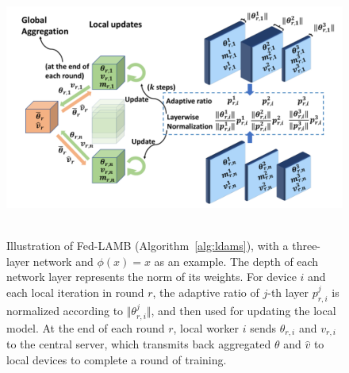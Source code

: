 \documentclass[11pt]{article}
\begin{document}
\begin{figure}[H]
\centering
\mbox{\hspace{-0.15in}
        \includegraphics[width=\textwidth]{plot/plot1.pdf}
}
	\caption{Illustration of Fed-LAMB (Algorithm~\ref{alg:ldams}), with a three-layer network and $\phi(x)=x$ as an example. The depth of each network layer represents the norm of its weights. For device $i$ and each local iteration in round $r$, the adaptive ratio of $j$-th layer $p_{r,i}^j$ is normalized according to $\Vert \theta_{r,i}^j\Vert$, and then used for updating the local model. At the end of each round $r$, local worker $i$ sends $\theta_{r,i}$ and $v_{r,i}$ to the central server, which transmits back aggregated $\theta$ and $\hat v$ to local devices to complete a round of training.}
	\label{fig:illustrate}\vspace{-0.1in}
\end{figure}
\end{document}
